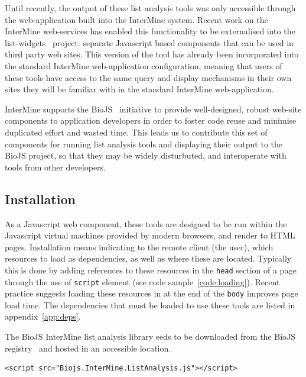 \documentclass[10pt,a4paper,twocolumn]{article}
\begin{document}
Until recently, the output of these list analysis tools was only accessible through
the web-application built into the InterMine system. Recent work on the InterMine web-services
has enabled this functionality to be externalised into the list-widgets~\cite{site:list-widgets}
project: separate Javascript based components that can be used in third party web sites.
This version of the tool has already been incorporated into the standard InterMine web-application configuration, meaning that users of these tools have access to the same query
and display mechanisms in their own sites they will be familiar with in
the standard InterMine web-application.

InterMine supports the BioJS~\cite{site:biojs} initiative to provide well-designed, robust web-site
components to application developers in order to foster code reuse and minimise duplicated
effort and wasted time. This leads us to contribute this set of components for running
list analysis tools and displaying their output to the BioJS project, so that they may
be widely disturbuted, and interoperate with tools from other developers.

\subsection*{Installation}

As a Javascript web component, these tools are designed to be run within the Javascript
virtual machines provided by modern browsers, and render to HTML pages. Installation means
indicating to the remote client (the user), which resources to load as dependencies, as well
as where these are located. Typically this is done by adding references to these resources in
the \texttt{head} section of a page through the use of \texttt{script} element (see code
sample~\ref{code:loading}). Recent practice suggests loading these 
resources in at the end of the \texttt{body} improves page load time. The dependencies
that must be loaded to use these tools are listed in appendix~\ref{app:deps}.

The BioJS InterMine list analysis library eeds to be downloaded from the BioJS registry~\cite{site:biojs-registry}
and hosted in an accessible location.

\begin{lstlisting}[caption={Loading the list analysis tools library.}, label={code:loading}]
<script src="Biojs.InterMine.ListAnalysis.js"></script>
\end{lstlisting}
\end{document}
